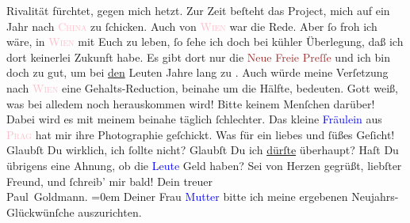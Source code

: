                Rivalität fürchtet, gegen mich hetzt. Zur Zeit beſteht das Project, mich auf ein Jahr
               nach \textsc{\textcolor{pink}{China}{}\ledrightnote{\textcolor{pink}{China}}} zu ſchicken. Auch von \textsc{\textcolor{pink}{Wien}{}\ledrightnote{\textcolor{pink}{Wien}}} war die Rede. Aber ſo froh ich wäre, in \textsc{\textcolor{pink}{Wien}{}\ledrightnote{\textcolor{pink}{Wien}}} mit Euch zu leben, ſo ſehe ich doch  bei kühler Überlegung, daß ich dort keinerlei Zukunft habe. Es gibt dort nur
               die \textcolor{brown}{Neue Freie Preſſe}{}\ledrightnote{\textcolor{brown}{Neue Freie Presse}} und ich bin  doch zu gut, um bei \uline{den} Leuten Jahre lang zu \label{K_L02835-2v}\label{K_L02835-2h}. Auch würde meine Verſetzung nach \textsc{\textcolor{pink}{Wien}{}\ledrightnote{\textcolor{pink}{Wien}}} eine Gehalts-Reduction, beinahe um die Hälfte, bedeuten. Gott weiß, was bei
               alledem noch herauskommen wird! Bitte \label{T_L02835-1v}\label{T_L02835-1h} keinem Menſchen darüber!\pend
           \pstart
           {\pb}Dabei wird es mit meinem \label{K_L02835-33v}\label{K_L02835-33h} beinahe täglich ſchlechter.\pend
           \pstart
           Das kleine \textcolor{blue}{Fräulein}{} aus \textsc{\textcolor{pink}{Prag}{}\ledrightnote{\textcolor{pink}{Prag}}} hat mir ihre Photographie geſchickt. Was für ein liebes und ſüßes Geſicht!
               Glaubſt Du wirklich, ich ſollte nicht? Glaubſt Du ich \uline{dürſte} überhaupt? Haſt Du übrigens eine Ahnung, ob die \textcolor{blue}{Leute}{} Geld haben?\pend
           \pstart
           Sei von Herzen gegrüßt, liebſter Freund, und ſchreib’ mir bald!\pend
           \pstart
           Dein treuer {\\[\baselineskip]}\spacefill\mbox{Paul Goldmann.}\pend
           \leftskip=0em{}\pstart
           \noindent{}Deiner Frau \textcolor{blue}{Mutter}{} bitte
                  ich meine ergebenen Neujahrs-Glückwünſche auszurichten.\pend
           \endnumbering{}  
      